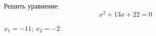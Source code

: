 \begin{ex}
	Решить уравнение:
	$$ x^2+13x+22=0 $$
	\begin{answer}
		$x_1=-11$; $x_2=-2$
	\end{answer}
\end{ex}